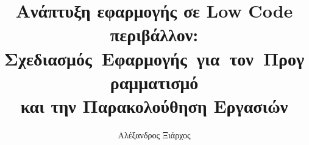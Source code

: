 \documentclass[11pt,a4paper]{template}
\title{Ανάπτυξη εφαρμογής σε Low Code περιβάλλον: \mbox{Σχεδιασμός Εφαρμογής για τον Προγραμματισμό} \\
	και την Παρακολούθηση Εργασιών}
\author{Αλέξανδρος Ξιάρχος}
\begin{document}
\maketitle

\frontmatter
	
	
	\tableofcontents
	\listoffigures
	\listoftables
\clearpage

\mainmatter
\cleardoublepage
\pagebreak

	
	
	
	
	
	
    
    

    \printbibliography
\end{document}

